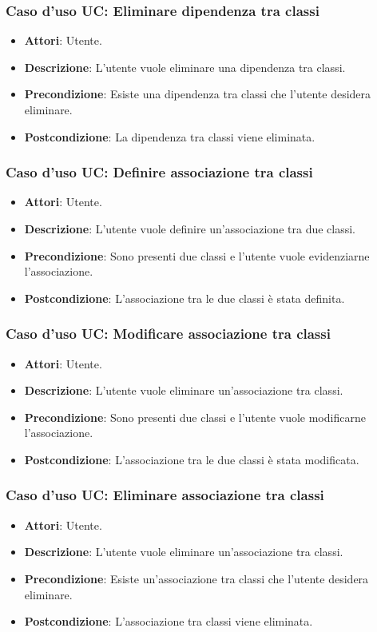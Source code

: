 \documentclass[../AnalisiDeiRequisiti.tex]{subfiles}
\begin{document}
		\subsubsection{Caso d'uso UC: Eliminare dipendenza tra classi}
		\begin{itemize}
			\item\textbf{Attori}: Utente.
			\item\textbf{Descrizione}: L'utente vuole eliminare una dipendenza tra classi.
			\item\textbf{Precondizione}: Esiste una dipendenza tra classi che l'utente desidera eliminare.
			\item\textbf{Postcondizione}: La dipendenza tra classi viene eliminata.
		\end{itemize}
		
		\subsubsection{Caso d'uso UC: Definire associazione tra classi}
		\begin{itemize}
			\item\textbf{Attori}: Utente.
			\item\textbf{Descrizione}: L'utente vuole definire un'associazione tra due classi.
			\item\textbf{Precondizione}: Sono presenti due classi e l'utente vuole evidenziarne l'associazione.
			\item\textbf{Postcondizione}: L'associazione tra le due classi è stata definita.
		\end{itemize}
		
		\subsubsection{Caso d'uso UC: Modificare associazione tra classi}
		\begin{itemize}
			\item\textbf{Attori}: Utente.
			\item\textbf{Descrizione}: L'utente vuole eliminare un'associazione tra classi.
			\item\textbf{Precondizione}: Sono presenti due classi e l'utente vuole modificarne l'associazione.
			\item\textbf{Postcondizione}: L'associazione tra le due classi è stata modificata.
		\end{itemize}
		
		\subsubsection{Caso d'uso UC: Eliminare associazione tra classi}
		\begin{itemize}
			\item\textbf{Attori}: Utente.
			\item\textbf{Descrizione}: L'utente vuole eliminare un'associazione tra classi.
			\item\textbf{Precondizione}: Esiste un'associazione tra classi che l'utente desidera eliminare.
			\item\textbf{Postcondizione}: L'associazione tra classi viene eliminata.
		\end{itemize}
		
\end{document}
